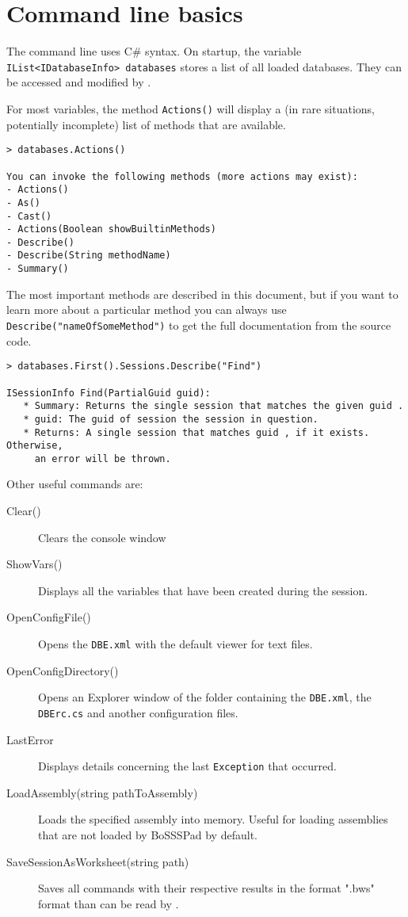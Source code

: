 \section{Command line basics}

The command line uses C\# syntax.
On startup, the variable \lstinline{IList<IDatabaseInfo> databases} stores a list of all loaded databases. They can be accessed and modified by \BoSSSpad{}.

For most variables, the method \lstinline{Actions()} will display a (in rare situations, potentially incomplete) list of methods that are available.
\begin{lstlisting}
> databases.Actions()

You can invoke the following methods (more actions may exist):
- Actions()
- As()
- Cast()
- Actions(Boolean showBuiltinMethods)
- Describe()
- Describe(String methodName)
- Summary()
\end{lstlisting}

The most important methods are described in this document, but if you want to learn more about a particular method you can always use \lstinline{Describe("nameOfSomeMethod")} to get the full documentation from the source code.
\begin{lstlisting}
> databases.First().Sessions.Describe("Find")

ISessionInfo Find(PartialGuid guid):
   * Summary: Returns the single session that matches the given guid .
   * guid: The guid of session the session in question.
   * Returns: A single session that matches guid , if it exists. Otherwise,
     an error will be thrown.
\end{lstlisting}

Other useful commands are:
\begin{description}
	\item[Clear()]
	Clears the console window
	
	\item[ShowVars()]
	Displays all the variables that have been created during the \BoSSSpad{} session.

	\item[OpenConfigFile()]
	Opens the \lstinline{DBE.xml} with the default viewer for text files.
	
	\item[OpenConfigDirectory()]
	Opens an Explorer window of the folder containing the \lstinline{DBE.xml}, the \lstinline{DBErc.cs} and another configuration files.
	
	\item[LastError]
	Displays details concerning the last \lstinline{Exception} that occurred.
	
	\item[LoadAssembly(string pathToAssembly)]
	Loads the specified assembly into memory. Useful for loading assemblies that are not loaded by BoSSSPad by default.

	\item[SaveSessionAsWorksheet(string path)]
	Saves all commands with their respective results in the format ".bws" format than can be read by \BoSSSpad{}.
\end{description}

